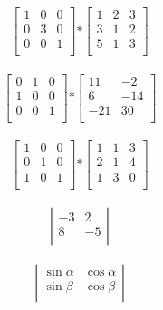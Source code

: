 \documentclass[a4paper]{article}
\begin{document}
$$
\left[ \begin{array}{ccc}
1 & 0 & 0 \\
0 & 3 & 0 \\
0 & 0 & 1 \\
\end{array} \right] 
\mathbf{*}
\left[ \begin{array}{ccc}
1 & 2 & 3 \\
3 & 1 & 2 \\
5 & 1 & 3 \\
\end{array} \right]
$$\\

$$
\left[ \begin{array}{ccc}
0 & 1 & 0 \\
1 & 0 & 0 \\
0 & 0 & 1 \\
\end{array} \right] 
\mathbf{*}
\left[ \begin{array}{cc}
11 & -2\\
6 & -14\\
-21 & 30\\
\end{array} \right]
$$\\

$$
\left[ \begin{array}{ccc}
1 & 0 & 0 \\
0 & 1 & 0 \\
1 & 0 & 1 \\
\end{array} \right] 
\mathbf{*}
\left[ \begin{array}{ccc}
1 & 1 & 3 \\
2 & 1 & 4 \\
1 & 3 & 0 \\
\end{array} \right]
$$\\

$$
\left| \begin{array}{rr}
-3 & 2\\
8 & -5\\
\end{array} \right|
$$\\

$$
\left| \begin{array}{cc}
\sin\alpha & \cos\alpha\\
\sin\beta & \cos\beta\\
\end{array} \right|
$$\\
\end{document}
